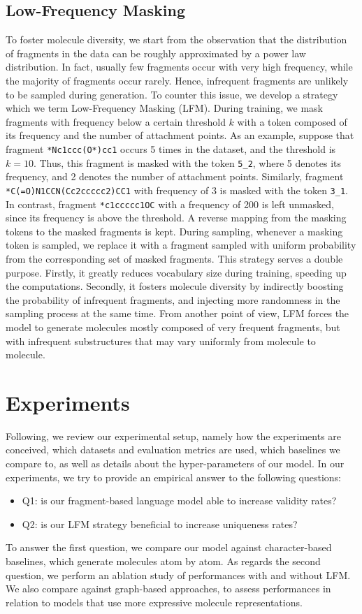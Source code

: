 \subsection{Low-Frequency Masking}
To foster molecule diversity, we start from the observation that the distribution of fragments in the data can be roughly approximated by a power law distribution. In fact, usually few fragments occur with very high frequency, while the majority of fragments occur rarely. Hence, infrequent fragments are unlikely to be sampled during generation. To counter this issue, we develop a strategy which we term Low-Frequency Masking (LFM). During training, we mask fragments with frequency below a certain threshold $k$ with a token composed of its frequency and the number of attachment points. As an example, suppose that fragment \texttt{*Nc1ccc(O*)cc1} occurs 5 times in the dataset, and the threshold is $k=10$. Thus, this fragment is masked with the token \texttt{5\_2}, where 5 denotes its frequency, and 2 denotes the number of attachment points. Similarly, fragment \texttt{*C(=O)N1CCN(Cc2ccccc2)CC1} with frequency of 3 is masked with the token \texttt{3\_1}. In contrast, fragment \texttt{*c1ccccc1OC} with a frequency of 200 is left unmasked, since its frequency is above the threshold. A reverse mapping from the masking tokens to the masked fragments is kept. During sampling, whenever a masking token is sampled, we replace it with a fragment sampled with uniform probability from the corresponding set of masked fragments. This strategy serves a double purpose. Firstly, it greatly reduces vocabulary size during training, speeding up the computations. Secondly, it fosters molecule diversity by indirectly boosting the probability of infrequent fragments, and injecting more randomness in the sampling process at the same time. From another point of view, LFM forces the model to generate molecules mostly composed of very frequent fragments, but with infrequent substructures that may vary uniformly from molecule to molecule.

\section{Experiments}\label{sec:aistats-experiments}
Following, we review our experimental setup, namely how the experiments are conceived, which datasets and evaluation metrics are used, which baselines we compare to, as well as details about the hyper-parameters of our model. In our experiments, we try to provide an empirical answer to the following questions:
\begin{itemize}
    \item Q1: is our fragment-based language model able to increase validity rates?
    \item Q2: is our LFM strategy beneficial to increase uniqueness rates?
\end{itemize}
To answer the first question, we compare our model against character-based baselines, which generate molecules atom by atom. As regards the second question, we perform an ablation study of performances with and without LFM. We also compare against graph-based approaches, to assess performances in relation to models that use more expressive molecule representations.

